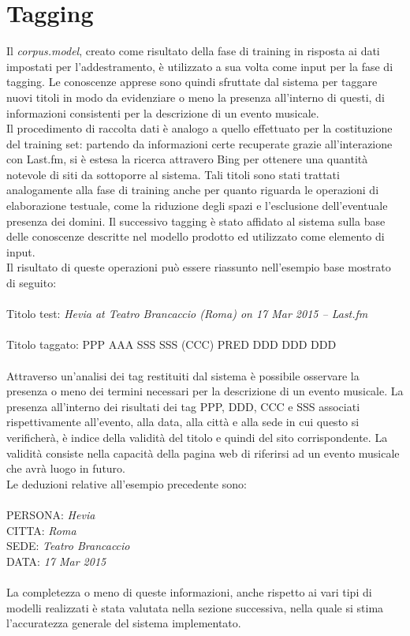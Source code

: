 \documentclass[a4paper]{report}
\begin{document}
\section{Tagging}
Il \textit{corpus.model}, creato come risultato della fase di training in risposta ai dati impostati per l'addestramento, è utilizzato a sua volta come input per la fase di tagging. Le conoscenze apprese sono quindi sfruttate dal sistema per taggare nuovi titoli in modo da evidenziare o meno la presenza all'interno di questi, di informazioni consistenti per la descrizione di un evento musicale. \\
Il procedimento di raccolta dati è analogo a quello effettuato per la costituzione del training set: partendo da informazioni certe recuperate grazie all'interazione con Last.fm, si è estesa la ricerca attravero Bing per ottenere una quantità notevole di siti da sottoporre al sistema. Tali titoli sono stati trattati analogamente alla fase di training anche per quanto riguarda le operazioni di elaborazione testuale, come la riduzione degli spazi e l'esclusione dell'eventuale presenza dei domini. Il successivo tagging è stato affidato al sistema sulla base delle conoscenze descritte nel modello prodotto ed utilizzato come elemento di input. \\
Il risultato di queste operazioni può essere riassunto nell'esempio base mostrato di seguito: \\ \\
Titolo test: \textit{Hevia at Teatro Brancaccio  (Roma) on 17 Mar 2015 – Last.fm} \\ \\
Titolo taggato: PPP AAA SSS SSS (CCC) PRED DDD DDD DDD \\ \\
Attraverso un'analisi dei tag restituiti dal sistema è possibile osservare la presenza o meno dei termini necessari per la descrizione di un evento musicale. La presenza all'interno dei risultati dei tag PPP, DDD, CCC e SSS associati rispettivamente all'evento, alla data, alla città e alla sede in cui questo si verificherà, è indice della validità del titolo e quindi del sito corrispondente. La validità consiste nella capacità della pagina web di riferirsi ad un evento musicale che avrà luogo in futuro.\\ Le deduzioni relative all'esempio precedente sono: \\ \\
PERSONA: \textit{Hevia}\\
CITTA: \textit{Roma}\\
SEDE: \textit{Teatro Brancaccio}\\
DATA: \textit{17 Mar 2015} \\ \\
La completezza o meno di queste informazioni, anche rispetto ai vari tipi di modelli realizzati è stata valutata nella sezione successiva, nella quale si stima l'accuratezza generale del sistema implementato.
\end{document}
